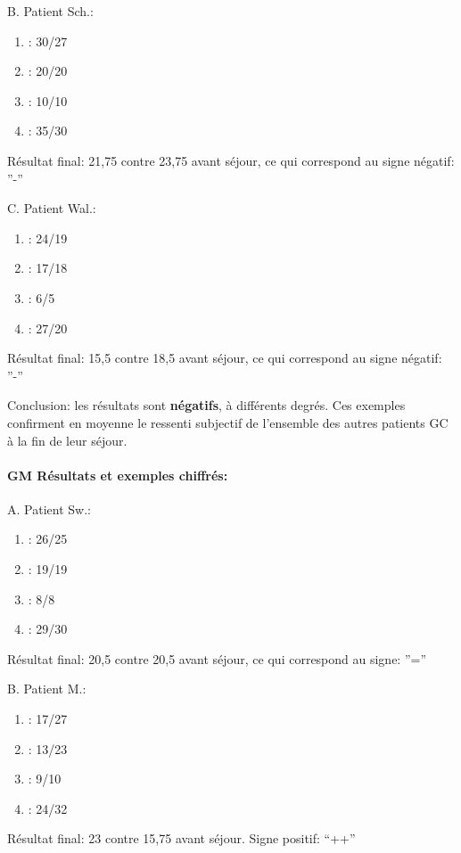 \begin{enumerate}
        
        B. Patient Sch.:

	\begin{enumerate}
 		\item : 30/27 
 		\item : 20/20
 		\item : 10/10
 		\item : 35/30
         \end{enumerate}
                Résultat final: 21,75 contre 23,75 avant séjour, ce qui
        correspond au signe négatif: ''-''

                
                C. Patient Wal.:
	\begin{enumerate}
 		\item : 24/19
 		\item : 17/18
 		\item : 6/5
 		\item : 27/20
 	\end{enumerate}
        Résultat final: 15,5 contre 18,5 avant séjour, ce qui
        correspond au signe négatif: ''-''

        Conclusion: les résultats sont \textbf{négatifs}, à différents degrés.
        Ces exemples confirment en moyenne 
        le ressenti subjectif de l'ensemble des autres patients GC à la fin de leur séjour.

        \paragraph{GM Résultats et exemples chiffrés:}


        
   A. Patient Sw.:
	\begin{enumerate}
 		\item : 26/25 
 		\item : 19/19
 		\item : 8/8
 		\item : 29/30
 	\end{enumerate}
        Résultat final: 20,5 contre 20,5 avant séjour, ce qui
        correspond au signe:  ''=''

        
        B. Patient M.:
	\begin{enumerate}
 		\item : 17/27 
 		\item : 13/23
 		\item : 9/10
 		\item : 24/32
                \end{enumerate}
                 Résultat final: 23 contre 15,75 avant séjour. Signe positif:  ``++''


\end{enumerate}
